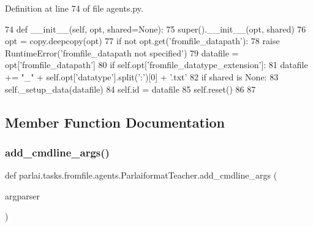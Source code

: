 Definition at line 74 of file agents.\+py.


\begin{DoxyCode}
74     \textcolor{keyword}{def }\_\_init\_\_(self, opt, shared=None):
75         super().\_\_init\_\_(opt, shared)
76         opt = copy.deepcopy(opt)
77         \textcolor{keywordflow}{if} \textcolor{keywordflow}{not} opt.get(\textcolor{stringliteral}{'fromfile\_datapath'}):
78             \textcolor{keywordflow}{raise} RuntimeError(\textcolor{stringliteral}{'fromfile\_datapath not specified'})
79         datafile = opt[\textcolor{stringliteral}{'fromfile\_datapath'}]
80         \textcolor{keywordflow}{if} self.opt[\textcolor{stringliteral}{'fromfile\_datatype\_extension'}]:
81             datafile += \textcolor{stringliteral}{"\_"} + self.opt[\textcolor{stringliteral}{'datatype'}].split(\textcolor{stringliteral}{':'})[0] + \textcolor{stringliteral}{'.txt'}
82         \textcolor{keywordflow}{if} shared \textcolor{keywordflow}{is} \textcolor{keywordtype}{None}:
83             self.\_setup\_data(datafile)
84         self.id = datafile
85         self.reset()
86 
87 
\end{DoxyCode}


\subsection{Member Function Documentation}
\mbox{\label{classparlai_1_1tasks_1_1fromfile_1_1agents_1_1ParlaiformatTeacher_ac1bd0a850a44dc2a2961aa04096d77bf}} 
\subsubsection{\texorpdfstring{add\+\_\+cmdline\+\_\+args()}{add\_cmdline\_args()}}
{\footnotesize\ttfamily def parlai.\+tasks.\+fromfile.\+agents.\+Parlaiformat\+Teacher.\+add\+\_\+cmdline\+\_\+args (\begin{DoxyParamCaption}\item[{}]{argparser }\end{DoxyParamCaption})\hspace{0.3cm}{\ttfamily [static]}}




